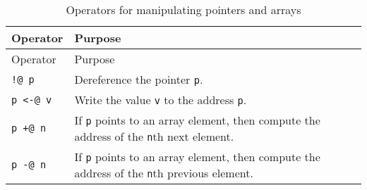 \hypertarget{Table19sub1}{}
\begin{longtable}[]{@{}ll@{}}
\caption{Operators for manipulating pointers and arrays}\tabularnewline
\toprule
\begin{minipage}[b]{0.50\columnwidth}\raggedright
Operator\strut
\end{minipage} & \begin{minipage}[b]{0.44\columnwidth}\raggedright
Purpose\strut
\end{minipage}\tabularnewline
\midrule
\endfirsthead
\toprule
\begin{minipage}[b]{0.50\columnwidth}\raggedright
Operator\strut
\end{minipage} & \begin{minipage}[b]{0.44\columnwidth}\raggedright
Purpose\strut
\end{minipage}\tabularnewline
\midrule
\endhead
\begin{minipage}[t]{0.50\columnwidth}\raggedright
\passthrough{\lstinline"!@ p"}\strut
\end{minipage} & \begin{minipage}[t]{0.44\columnwidth}\raggedright
Dereference the pointer \passthrough{\lstinline!p!}.\strut
\end{minipage}\tabularnewline
\begin{minipage}[t]{0.50\columnwidth}\raggedright
\passthrough{\lstinline!p <-@ v!}\strut
\end{minipage} & \begin{minipage}[t]{0.44\columnwidth}\raggedright
Write the value \passthrough{\lstinline!v!} to the address
\passthrough{\lstinline!p!}.\strut
\end{minipage}\tabularnewline
\begin{minipage}[t]{0.50\columnwidth}\raggedright
\passthrough{\lstinline!p +@ n!}\strut
\end{minipage} & \begin{minipage}[t]{0.44\columnwidth}\raggedright
If \passthrough{\lstinline!p!} points to an array element, then compute
the address of the \passthrough{\lstinline!n!}th next element.\strut
\end{minipage}\tabularnewline
\begin{minipage}[t]{0.50\columnwidth}\raggedright
\passthrough{\lstinline!p -@ n!}\strut
\end{minipage} & \begin{minipage}[t]{0.44\columnwidth}\raggedright
If \passthrough{\lstinline!p!} points to an array element, then compute
the address of the \passthrough{\lstinline!n!}th previous element.\strut
\end{minipage}\tabularnewline
\bottomrule
\end{longtable}

